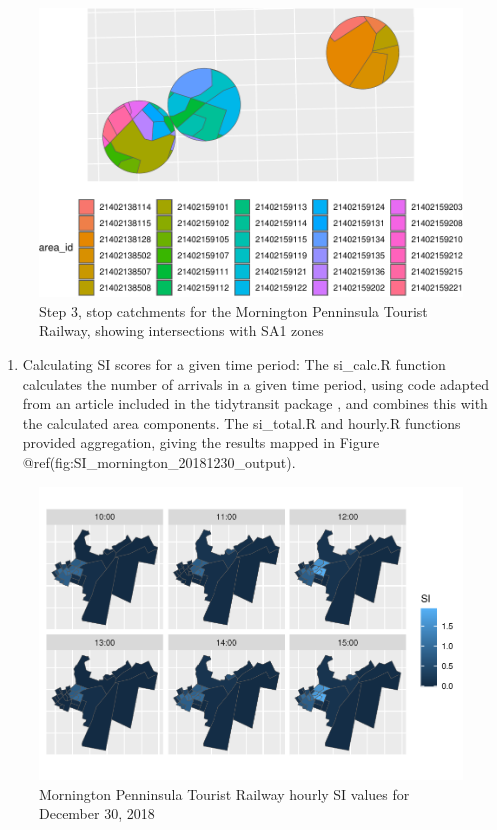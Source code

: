 \documentclass[preprint, 3p,
authoryear]{elsarticle} %
\providecommand{\tightlist}{%
  \setlength{\itemsep}{0pt}\setlength{\parskip}{0pt}}
\begin{document}
\begin{figure}
\includegraphics[width=1\linewidth]{Leveraging_GTFS_to_assess_transit_supply_Transport_Geography_files/figure-latex/calculate_stop_in_or_near_areas_verbose-1} \caption{Step 3, stop catchments for the Mornington Penninsula Tourist Railway, showing intersections with SA1 zones}\label{fig:calculate_stop_in_or_near_areas_verbose}
\end{figure}

\begin{enumerate}
\def\labelenumi{(\arabic{enumi})}
\setcounter{enumi}{3}
\tightlist
\item
  Calculating SI scores for a given time period: The si\_calc.R function
  calculates the number of arrivals in a given time period, using code
  adapted from an article included in the tidytransit package
  \citep{tidytransit_departure_timetable}, and combines this with the
  calculated area components. The si\_total.R and hourly.R functions
  provided aggregation, giving the results mapped in Figure
  @ref(fig:SI\_mornington\_20181230\_output).
\end{enumerate}

\begin{figure}
\centering
\includegraphics{Leveraging_GTFS_to_assess_transit_supply_Transport_Geography_files/figure-latex/SI_mornington_20181230_output-1.pdf}
\caption{Mornington Penninsula Tourist Railway hourly SI values for
December 30, 2018}
\end{figure}
\end{document}
